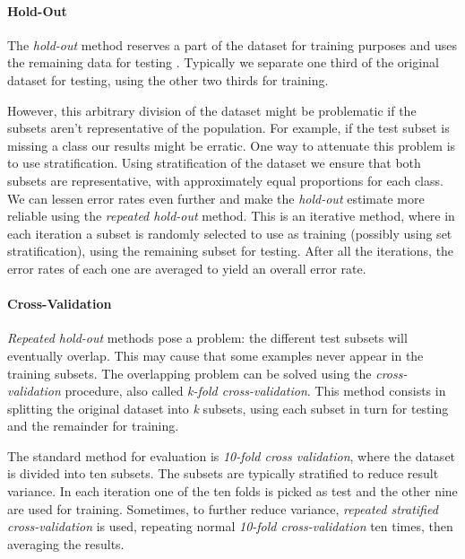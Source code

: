 \paragraph{Hold-Out}

The \textit{hold-out} method reserves a part of the dataset for training
purposes and uses the remaining data for testing \cite{witten2011data}.
Typically we separate one third of the original dataset for testing, using the
other two thirds for training.

However, this arbitrary division of the dataset might be problematic if the
subsets aren't representative of the population. For example, if the test subset
is missing a class our results might be erratic. One way to attenuate this
problem is to use stratification. Using stratification of the dataset we ensure
that both subsets are representative, with approximately equal proportions for
each class. We can lessen error rates even further and make the
\textit{hold-out} estimate more reliable using the \textit{repeated hold-out}
method. This is an iterative method, where in each iteration a subset is
randomly selected to use as training (possibly using set stratification), using
the remaining subset for testing. After all the iterations, the error rates of
each one are averaged to yield an overall error rate.

\paragraph{Cross-Validation}

\textit{Repeated hold-out} methods pose a problem: the different test subsets
will eventually overlap. This may cause that some examples never appear in the
training subsets. The overlapping problem can be solved using the
\textit{cross-validation} procedure, also called \textit{k-fold
cross-validation}. This method consists in splitting the original dataset into
\textit{k} subsets, using each subset in turn for testing and the remainder for
training.

The standard method for evaluation is \textit{10-fold cross validation}, where
the dataset is divided into ten subsets. The subsets are typically stratified to
reduce result variance. In each iteration one of the ten folds is picked as test
and the other nine are used for training. Sometimes, to further reduce variance,
\textit{repeated stratified cross-validation} is used, repeating normal
\textit{10-fold cross-validation} ten times, then averaging the results.

